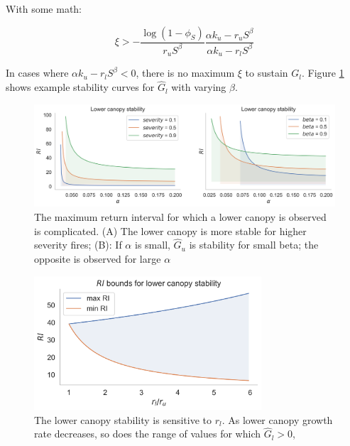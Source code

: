 \documentclass{article}
\begin{document}
With some math:

\begin{equation}
 	\xi > - \frac{\log(1-\phi_S)}{r_u S^\beta} \frac{\alpha k_u - r_u S^\beta}{\alpha k_u - r_l S^\beta}
\end{equation}

In cases where ${\alpha k_u - r_l S^\beta} < 0$, there is no maximum $\xi$ to sustain $G_l$.
Figure \ref{fig:G_l_stability_v_alpha} shows example stability curves for $\hat G_l$ with varying $\beta$.
        
 \begin{figure}[h]
 \centering
\includegraphics[width=40pc]{../fire_plots/G_l_stability_v_alpha}
 \caption{ The maximum return interval for which a lower canopy is observed is complicated.  (A) The lower canopy is more stable for higher severity fires; 
 (B): If  $\alpha$ is small, $\hat G_u$ is stability for small beta; the opposite is observed for large $\alpha$}
 \label{fig:G_l_stability_v_alpha}
 \end{figure}
   

 \begin{figure}[h]
 \centering
\includegraphics[width=20pc]{../fire_plots/G_l_stability_v_rl}
 \caption{ The lower canopy stability is sensitive to $r_l$. As lower canopy growth rate decreases, so does the range of values for which $\hat G_l > 0$,}
 \label{fig:G_l_stability_v_rl}
 \end{figure}
  
\end{document}
